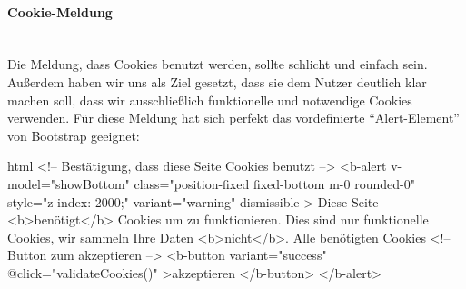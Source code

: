 \paragraph{Cookie-Meldung}
~\\
Die Meldung, dass Cookies benutzt werden, sollte schlicht und einfach sein. Außerdem haben wir uns als Ziel gesetzt, dass sie dem Nutzer deutlich klar machen soll, dass wir ausschließlich funktionelle und notwendige Cookies verwenden. Für diese Meldung hat sich perfekt das vordefinierte \enquote{Alert-Element} von Bootstrap geeignet:
\begin{code}{html}
	<!-- Bestätigung, dass diese Seite Cookies benutzt -->
	<b-alert
		v-model="showBottom"
		class="position-fixed fixed-bottom m-0 rounded-0"
		style="z-index: 2000;"
		variant="warning"
		dismissible
	>
		Diese Seite <b>benötigt</b> Cookies um zu funktionieren. Dies sind nur
		funktionelle Cookies, wir sammeln Ihre Daten <b>nicht</b>. Alle benötigten
		Cookies
		<!-- Button zum akzeptieren -->
		<b-button variant="success" @click="validateCookies()"
			>akzeptieren
		</b-button>
	</b-alert>
\end{code}

\newpage
